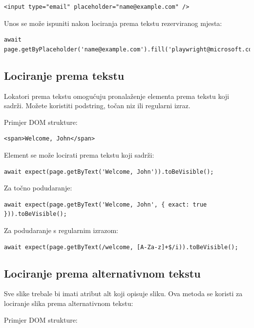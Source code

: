 \begin{verbatim}
<input type="email" placeholder="name@example.com" />
\end{verbatim}

Unos se može ispuniti nakon lociranja prema tekstu rezerviranog mjesta:

\begin{verbatim}
await page.getByPlaceholder('name@example.com').fill('playwright@microsoft.com');
\end{verbatim}

\subsection*{Lociranje prema tekstu}

Lokatori prema tekstu omogućuju pronalaženje elementa prema tekstu koji sadrži.
Možete koristiti podstring, točan niz ili regularni izraz.

Primjer DOM strukture:

\begin{verbatim}
<span>Welcome, John</span>
\end{verbatim}

Element se može locirati prema tekstu koji sadrži:

\begin{verbatim}
await expect(page.getByText('Welcome, John')).toBeVisible();
\end{verbatim}

Za točno podudaranje:

\begin{verbatim}
await expect(page.getByText('Welcome, John', { exact: true })).toBeVisible();
\end{verbatim}

Za podudaranje s regularnim izrazom:

\begin{verbatim}
await expect(page.getByText(/welcome, [A-Za-z]+$/i)).toBeVisible();
\end{verbatim}

\subsection*{Lociranje prema alternativnom tekstu}

Sve slike trebale bi imati atribut alt koji opisuje sliku.
Ova metoda se koristi za lociranje slika prema alternativnom tekstu:

Primjer DOM strukture:

